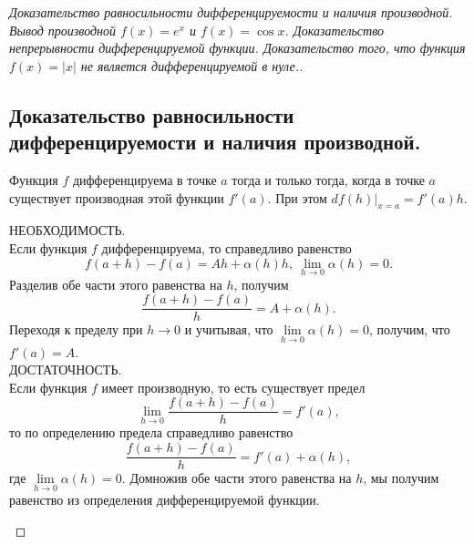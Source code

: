 
\label{sec_Proofs04}
\begin{proof}[Доказательство равносильности дифференцируемости и наличия производной. Вывод производной $f(x) = e^x$ и $f(x) = \cos x$. Доказательство непрерывности дифференцируемой функции. Доказательство того, что функция $f(x) = |x|$ не является дифференцируемой в нуле.]
    \subsection*{Доказательство равносильности дифференцируемости и наличия производной.}
    \begin{note}[amber]
        Функция $f$ дифференцируема в точке $a$ тогда и только тогда, когда в точке $a$ существует производная этой функции $f'(a)$. При этом $df(h)\vert_{x=a} = f'(a)h$. \\
        \begin{note}[purple]
            НЕОБХОДИМОСТЬ.\\
            Если функция $f$ дифференцируема, то справедливо равенство
            \[
            f(a+h)-f(a)=Ah+\alpha(h)h, \ \lim_{h\to 0}\alpha(h)=0.
            \]
            Разделив обе части этого равенства на $h$, получим
            \[
            \frac{f(a+h)-f(a)}{h}=A+\alpha(h).
            \]
            Переходя к пределу при $h\to 0$ и учитывая, что $\lim\limits_{h\to 0}\alpha(h)=0$, получим, что $f'(a)=A$.\\
            ДОСТАТОЧНОСТЬ.\\
            Если функция $f$ имеет производную, то есть существует предел
            \[
            \lim_{h\to 0}\frac{f(a+h)-f(a)}{h}=f'(a),
            \]
            то по определению предела справедливо равенство
            \[
            \frac{f(a+h)-f(a)}{h}=f'(a)+\alpha(h),
            \]
            где $\lim\limits_{h\to 0}\alpha(h)=0$. Домножив обе части этого равенства на $h$, мы получим равенство из определения дифференцируемой функции.
        \end{note}
    \end{note}


\end{proof}

